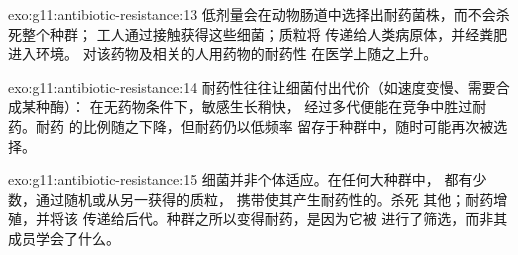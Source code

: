 \begin{solution}{exo:g11:antibiotic-resistance:13}
低剂量会在动物肠道中选择出耐药菌株，而不会杀死整个种群；
工人通过接触获得这些细菌；质粒将
传递给人类病原体，并经粪肥进入环境。
对该药物及相关的人用药物的耐药性
在医学上随之上升。
\end{solution}

\begin{solution}{exo:g11:antibiotic-resistance:14}
耐药性往往让细菌付出代价（如速度变慢、需要合成某种酶）：
在无药物条件下，敏感生长稍快，
经过多代便能在竞争中胜过耐药。耐药
的比例随之下降，但耐药仍以低频率
留存于种群中，随时可能再次被选择。
\end{solution}

\begin{solution}{exo:g11:antibiotic-resistance:15}
细菌并非个体适应。在任何大种群中，
都有少数，通过随机或从另一获得的质粒，
携带使其产生耐药性的。杀死
其他；耐药增殖，并将该
传递给后代。种群之所以变得耐药，是因为它被
进行了筛选，而非其成员学会了什么。
\end{solution}

